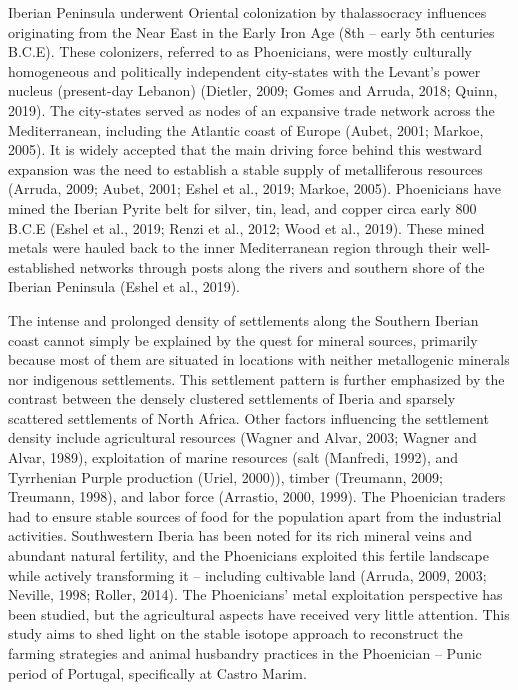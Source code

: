 \documentclass[3p]{elsarticle} %
\begin{document}
Iberian Peninsula underwent Oriental colonization by thalassocracy influences originating from the Near East in the Early Iron Age (8th -- early 5th centuries B.C.E). These colonizers, referred to as Phoenicians, were mostly culturally homogeneous and politically independent city-states with the Levant's power nucleus (present-day Lebanon) (Dietler, 2009; Gomes and Arruda, 2018; Quinn, 2019). The city-states served as nodes of an expansive trade network across the Mediterranean, including the Atlantic coast of Europe (Aubet, 2001; Markoe, 2005). It is widely accepted that the main driving force behind this westward expansion was the need to establish a stable supply of metalliferous resources (Arruda, 2009; Aubet, 2001; Eshel et al., 2019; Markoe, 2005). Phoenicians have mined the Iberian Pyrite belt for silver, tin, lead, and copper circa early 800 B.C.E (Eshel et al., 2019; Renzi et al., 2012; Wood et al., 2019). These mined metals were hauled back to the inner Mediterranean region through their well-established networks through posts along the rivers and southern shore of the Iberian Peninsula (Eshel et al., 2019).

The intense and prolonged density of settlements along the Southern Iberian coast cannot simply be explained by the quest for mineral sources, primarily because most of them are situated in locations with neither metallogenic minerals nor indigenous settlements. This settlement pattern is further emphasized by the contrast between the densely clustered settlements of Iberia and sparsely scattered settlements of North Africa. Other factors influencing the settlement density include agricultural resources (Wagner and Alvar, 2003; Wagner and Alvar, 1989), exploitation of marine resources (salt (Manfredi, 1992), and Tyrrhenian Purple production (Uriel, 2000)), timber (Treumann, 2009; Treumann, 1998), and labor force (Arrastio, 2000, 1999). The Phoenician traders had to ensure stable sources of food for the population apart from the industrial activities. Southwestern Iberia has been noted for its rich mineral veins and abundant natural fertility, and the Phoenicians exploited this fertile landscape while actively transforming it -- including cultivable land (Arruda, 2009, 2003; Neville, 1998; Roller, 2014). The Phoenicians' metal exploitation perspective has been studied, but the agricultural aspects have received very little attention. This study aims to shed light on the stable isotope approach to reconstruct the farming strategies and animal husbandry practices in the Phoenician -- Punic period of Portugal, specifically at Castro Marim.
\end{document}
